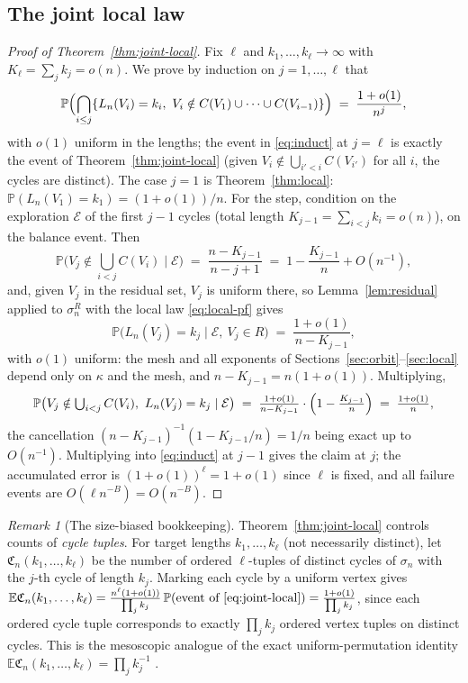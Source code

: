 \documentclass[11pt]{article}
\newcommand{\E}{\mathbb{E}}
\newcommand{\Prob}{\mathbb{P}}
\newcommand{\1}{\mathbf{1}}
\newcommand{\cE}{\mathcal{E}}
\theoremstyle{remark}
\newtheorem{remark}[theorem]{Remark}
\begin{document}
\subsection{The joint local law}
\begin{proof}[Proof of Theorem~\ref{thm:joint-local}]
Fix $\ell$ and $k_1,\dots,k_\ell\to\infty$ with $K_\ell=\sum_j k_j=o(n)$.
We prove by induction on $j=1,\dots,\ell$ that
\begin{equation}\label{eq:induct}
\Prob\Bigl(\bigcap_{i\le j}\{L_n(V_i)=k_i,\ V_i\notin
C(V_1)\cup\cdots\cup C(V_{i-1})\}\Bigr)
\;=\;\frac{1+o(1)}{n^j},
\end{equation}
with $o(1)$ uniform in the lengths; the event in \eqref{eq:induct} at
$j=\ell$ is exactly the event of Theorem~\ref{thm:joint-local} (given
$V_i\notin\bigcup_{i'<i}C(V_{i'})$ for all $i$, the cycles are distinct).
The case $j=1$ is Theorem~\ref{thm:local}:
$\Prob(L_n(V_1)=k_1)=(1+o(1))/n$. For the step, condition on the
exploration $\cE$ of the first $j-1$ cycles (total length
$K_{j-1}=\sum_{i<j}k_i=o(n)$), on the balance event. Then
\[
\Prob\bigl(V_j\notin\textstyle\bigcup_{i<j}C(V_i)\mid\cE\bigr)
\;=\;\frac{n-K_{j-1}}{n-j+1}\;=\;1-\frac{K_{j-1}}{n}+O(n^{-1}),
\]
and, given $V_j$ in the residual set, $V_j$ is uniform there, so
Lemma~\ref{lem:residual} applied to $\sigma_n^R$ with the local law
\eqref{eq:local-pf} gives
\[
\Prob\bigl(L_n(V_j)=k_j\mid\cE,\ V_j\in R\bigr)
\;=\;\frac{1+o(1)}{n-K_{j-1}},
\]
with $o(1)$ uniform: the mesh and all exponents of
Sections~\ref{sec:orbit}--\ref{sec:local} depend only on $\kappa$ and the
mesh, and $n-K_{j-1}=n(1+o(1))$. Multiplying,
\[
\Prob\bigl(V_j\notin\textstyle\bigcup_{i<j}C(V_i),\ L_n(V_j)=k_j
\mid\cE\bigr)
\;=\;\frac{1+o(1)}{n-K_{j-1}}\cdot
\Bigl(1-\frac{K_{j-1}}{n}\Bigr)\;=\;\frac{1+o(1)}{n},
\]
the cancellation $(n-K_{j-1})^{-1}(1-K_{j-1}/n)=1/n$ being exact up to
$O(n^{-1})$. Multiplying into \eqref{eq:induct} at $j-1$ gives the claim at
$j$; the accumulated error is $(1+o(1))^\ell=1+o(1)$ since $\ell$ is fixed,
and all failure events are $O(\ell n^{-B})=O(n^{-B})$.
\end{proof}

\begin{remark}[The size-biased bookkeeping]\label{rem:size-bias}
Theorem~\ref{thm:joint-local} controls counts of \emph{cycle tuples}. For
target lengths $k_1,\dots,k_\ell$ (not necessarily distinct), let
$\mathfrak{C}_n(k_1,\dots,k_\ell)$ be the number of ordered $\ell$-tuples of
distinct cycles of $\sigma_n$ with the $j$-th cycle of length $k_j$. Marking
each cycle by a uniform vertex gives
$\E\mathfrak{C}_n(k_1,\dots,k_\ell)
=\frac{n^\ell(1+o(1))}{\prod_j k_j}\,
\Prob(\text{event of }\eqref{eq:joint-local})
=\frac{1+o(1)}{\prod_j k_j}$,
since each ordered cycle tuple corresponds to exactly $\prod_j k_j$ ordered
vertex tuples on distinct cycles. This is the mesoscopic analogue of the
exact uniform-permutation identity
$\E\mathfrak{C}_n(k_1,\dots,k_\ell)=\prod_j k_j^{-1}$
\cite{ABT92}.
\end{remark}
\end{document}
